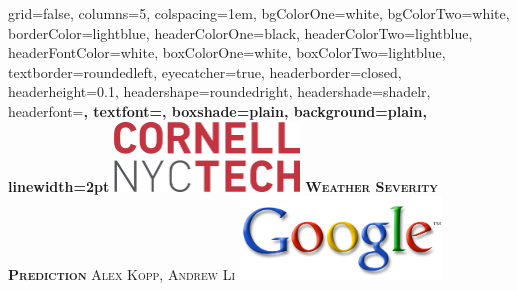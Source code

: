 \documentclass[landscape,final,a1paper,fontscale=0.45]{baposter}
\begin{document}
\begin{poster}%
  {
  grid=false,
  columns=5,
  colspacing=1em,
  bgColorOne=white,
  bgColorTwo=white,
  borderColor=lightblue,
  headerColorOne=black,
  headerColorTwo=lightblue,
  headerFontColor=white,
  boxColorOne=white,
  boxColorTwo=lightblue,
  textborder=roundedleft,
  eyecatcher=true,
  headerborder=closed,
  headerheight=0.1\textheight,
  headershape=roundedright,
  headershade=shadelr,
  headerfont=\Large\bf\textsc, %
  textfont={\setlength{\parindent}{1.5em}},
  boxshade=plain,
  background=plain,
  linewidth=2pt
  }
  {\includegraphics[height=5em]{images/cornelltech.png}} 
  {\bf\textsc{Weather Severity Prediction}\vspace{0.5em}}
  {\textsc{Alex Kopp, Andrew Li}}
  {%
    \includegraphics[height=6em]{images/google.jpg}
  }

    \newcommand{\colouredcircle}{%
      \tikz{\useasboundingbox (-0.2em,-0.32em) rectangle(0.2em,0.32em); \draw[draw=black,fill=lightblue,line width=0.03em] (0,0) circle(0.18em);}}


\end{poster}
\end{document}
